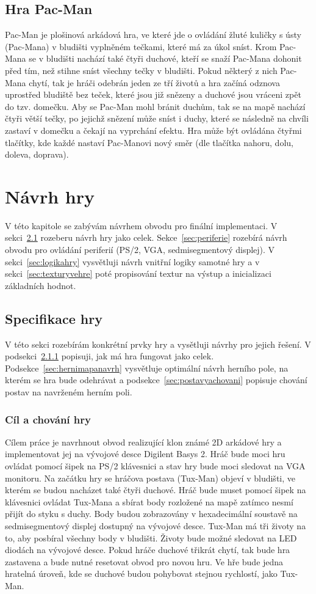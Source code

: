 \documentclass{report}
\begin{document}
\section{Hra Pac-Man}\label{sec:hrapacman}
Pac-Man je plošinová arkádová hra, ve které jde o ovládání žluté kuličky s ústy (Pac-Mana) v bludišti vyplněném tečkami, které má za úkol sníst. Krom Pac-Mana se v bludišti nachází také čtyři duchové, kteří se snaží Pac-Mana dohonit před tím, než stihne sníst všechny tečky v bludišti. Pokud některý z nich Pac-Mana chytí, tak je hráči odebrán jeden ze tří životů a hra začíná odznova uprostřed bludiště bez teček, které jsou již snězeny a duchové jsou vráceni zpět do tzv. domečku. Aby se Pac-Man mohl bránit duchům, tak se na mapě nachází čtyři větší tečky, po jejichž snězení může sníst i duchy, které se následně na chvíli zastaví v domečku a čekají na vyprchání efektu. Hra může být ovládána čtyřmi tlačítky, kde každé nastaví Pac-Manovi nový směr (dle tlačítka nahoru, dolu, doleva, doprava).  

\chapter{Návrh hry}\label{sec:navrhhry}
V této kapitole se zabývám návrhem obvodu pro finální implementaci. V sekci~\ref{sec:specifikacehry} rozeberu návrh hry jako celek. Sekce~\ref{sec:periferie} rozebírá návrh obvodu pro ovládání periferií (PS/2, VGA, sedmisegmentový displej). V sekci~\ref{sec:logikahry} vysvětluji návrh vnitřní logiky samotné hry a v sekci~\ref{sec:texturyvehre} poté propisování textur na výstup a inicializaci základních hodnot.

\section{Specifikace hry}\label{sec:specifikacehry}
V této sekci rozebírám konkrétní prvky hry a vysětluji návrhy pro jejich řešení. V podsekci~\ref{sec:cilachovani} popisuji, jak má hra fungovat jako celek. Podsekce~\ref{sec:hernimapanavrh} vysvětluje optimální návrh herního pole, na kterém se hra bude odehrávat a podsekce~\ref{sec:postavyachovani} popisuje chování postav na navrženém herním poli.
\subsection{Cíl a chování hry}\label{sec:cilachovani}
Cílem práce je navrhnout obvod realizující klon známé 2D arkádové hry a implementovat jej na vývojové desce Digilent Basys 2. Hráč bude moci hru ovládat pomocí šipek na PS/2 klávesnici a stav hry bude moci sledovat na VGA monitoru. Na začátku hry se hráčova postava (Tux-Man) objeví v bludišti, ve kterém se budou nacházet také čtyři duchové. Hráč bude muset pomocí šipek na klávesnici ovládat Tux-Mana a sbírat body rozložené na mapě zatímco nesmí přijít do styku s duchy. Body budou zobrazovány v hexadecimální soustavě na sedmisegmentový displej dostupný na vývojové desce. Tux-Man má tři životy na to, aby posbíral všechny body v bludišti. Životy bude možné sledovat na LED diodách na vývojové desce. Pokud hráče duchové třikrát chytí, tak bude hra zastavena a bude nutné resetovat obvod pro novou hru. Ve hře bude jedna hratelná úroveň, kde se duchové budou pohybovat stejnou rychlostí, jako Tux-Man.
\end{document}
